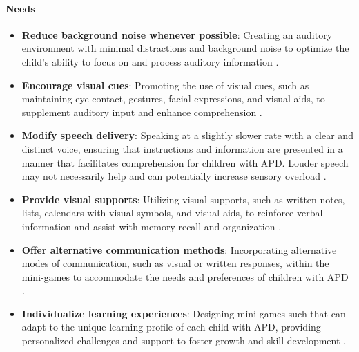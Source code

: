 \paragraph{Needs}
\begin{itemize}
    \item \textbf{Reduce background noise whenever possible}: Creating an auditory environment with minimal distractions and background noise to optimize the child's ability to focus on and process auditory information \cite{Nationwide}.
    \item \textbf{Encourage visual cues}: Promoting the use of visual cues, such as maintaining eye contact, gestures, facial expressions, and visual aids, to supplement auditory input and enhance comprehension \cite{Nationwide}.
    \item \textbf{Modify speech delivery}: Speaking at a slightly slower rate with a clear and distinct voice, ensuring that instructions and information are presented in a manner that facilitates comprehension for children with APD. Louder speech may not necessarily help and can potentially increase sensory overload \cite{KidsHealth}.
    \item \textbf{Provide visual supports}: Utilizing visual supports, such as written notes, lists, calendars with visual symbols, and visual aids, to reinforce verbal information and assist with memory recall and organization \cite{KidsHealth}.
    \item \textbf{Offer alternative communication methods}: Incorporating alternative modes of communication, such as visual or written responses, within the mini-games to accommodate the needs and preferences of children with APD \cite{KidsHealth}.
    \item \textbf{Individualize learning experiences}: Designing mini-games such that can adapt to the unique learning profile of each child with APD, providing personalized challenges and support to foster growth and skill development \cite{KidsHealth}.
\end{itemize}

